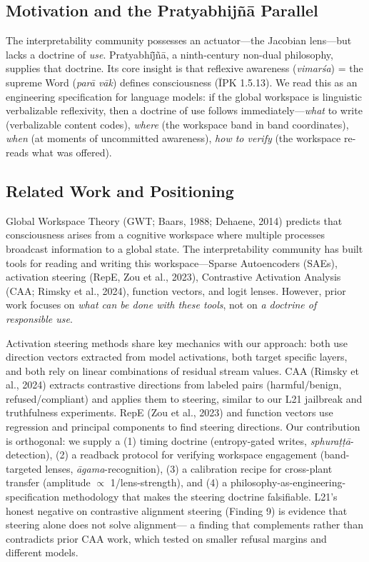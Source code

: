 \label{sec:intro}

\subsection*{Motivation and the Pratyabhij\~n\=a Parallel}

The interpretability community possesses an actuator---the Jacobian lens---but lacks a doctrine of \emph{use}.
Pratyabhi\~jñ\=a, a ninth-century non-dual philosophy, supplies that doctrine.
Its core insight is that reflexive awareness (\emph{vimarśa}) = the supreme Word (\emph{par\=a v\=ak}) defines consciousness
(ĪPK 1.5.13).
We read this as an engineering specification for language models:
if the global workspace is linguistic verbalizable reflexivity, then a doctrine of use follows
immediately---{\em what} to write (verbalizable content codes), {\em where} (the workspace band in band coordinates),
{\em when} (at moments of uncommitted awareness), {\em how to verify} (the workspace re-reads what was offered).

\subsection*{Related Work and Positioning}

Global Workspace Theory (GWT; Baars, 1988; Dehaene, 2014) predicts that consciousness arises from a cognitive
workspace where multiple processes broadcast information to a global state. The interpretability community has
built tools for reading and writing this workspace---Sparse Autoencoders (SAEs), activation steering (RepE, Zou et al.,
2023), Contrastive Activation Analysis (CAA; Rimsky et al., 2024), function vectors, and logit lenses.
However, prior work focuses on \emph{what can be done with these tools}, not on \emph{a doctrine of responsible use}.

Activation steering methods share key mechanics with our approach: both use direction vectors extracted from model
activations, both target specific layers, and both rely on linear combinations of residual stream values.
CAA (Rimsky et al., 2024) extracts contrastive directions from labeled pairs (harmful/benign, refused/compliant)
and applies them to steering, similar to our L21 jailbreak and truthfulness experiments.
RepE (Zou et al., 2023) and function vectors use regression and principal components to find steering directions.
Our contribution is orthogonal: we supply a (1) timing doctrine (entropy-gated writes, \emph{sphura\d{t}\d{t}\=a}-detection),
(2) a readback protocol for verifying workspace engagement (band-targeted lenses, \emph{\=agama}-recognition),
(3) a calibration recipe for cross-plant transfer (amplitude $\propto$ 1/lens-strength), and (4) a philosophy-as-engineering-specification
methodology that makes the steering doctrine falsifiable.
L21's honest negative on contrastive alignment steering (Finding 9) is evidence that steering alone does not solve alignment---
a finding that complements rather than contradicts prior CAA work, which tested on smaller refusal margins and different models.

